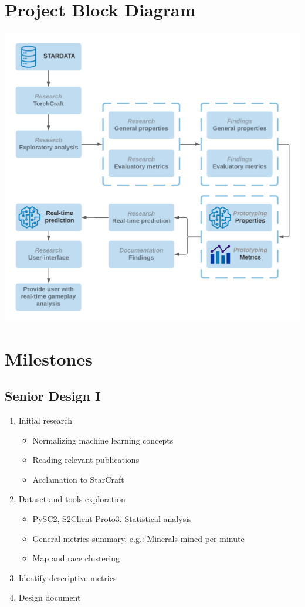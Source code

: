 \documentclass[a4paper,12pt]{report}
\begin{document}
\section{Project Block Diagram}
\begin{center}
    \captionsetup{type=figure}
    \includegraphics[width=.9\linewidth]{media/block_diagram.png}
\end{center}

\section{Milestones}
\subsection{Senior Design I}

\begin{enumerate}
    \item Initial research
    \begin{itemize}
        \item Normalizing machine learning concepts
        \item Reading relevant publications
        \item Acclamation to StarCraft
    \end{itemize}
    \item Dataset and tools exploration
    \begin{itemize}
        \item PySC2, S2Client-Proto3. Statistical analysis
        \item General metrics summary, e.g.: Minerals mined per minute
        \item Map and race clustering
    \end{itemize}
    \item Identify descriptive metrics
    \item Design document
\end{enumerate}
\end{document}
